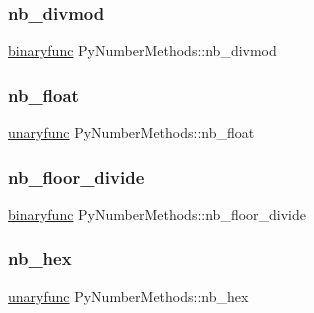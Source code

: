\mbox{\label{struct_py_number_methods_a993851f9a4d1ad172b8d3cf94382cb20}} 
\subsubsection{\texorpdfstring{nb\_divmod}{nb\_divmod}}
{\footnotesize\ttfamily \mbox{\hyperlink{_python27_2object_8h_a1a50b2d154f36acb9d215f2cdc1561a8}{binaryfunc}} Py\+Number\+Methods\+::nb\+\_\+divmod}

\mbox{\label{struct_py_number_methods_a29824c24582ece29d1e249f10231a7ba}} 
\subsubsection{\texorpdfstring{nb\_float}{nb\_float}}
{\footnotesize\ttfamily \mbox{\hyperlink{_python27_2object_8h_aeda2d77a292fdf2c686151d24b3dbf5a}{unaryfunc}} Py\+Number\+Methods\+::nb\+\_\+float}

\mbox{\label{struct_py_number_methods_a05f22c9ef56fb0c264dd1987975f6c0c}} 
\subsubsection{\texorpdfstring{nb\_floor\_divide}{nb\_floor\_divide}}
{\footnotesize\ttfamily \mbox{\hyperlink{_python27_2object_8h_a1a50b2d154f36acb9d215f2cdc1561a8}{binaryfunc}} Py\+Number\+Methods\+::nb\+\_\+floor\+\_\+divide}

\mbox{\label{struct_py_number_methods_aeb7ed25f65b93a21742a939995a87524}} 
\subsubsection{\texorpdfstring{nb\_hex}{nb\_hex}}
{\footnotesize\ttfamily \mbox{\hyperlink{_python27_2object_8h_aeda2d77a292fdf2c686151d24b3dbf5a}{unaryfunc}} Py\+Number\+Methods\+::nb\+\_\+hex}

